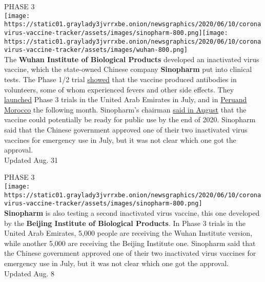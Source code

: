 PHASE 3\\
\texttt{[image: https://static01.graylady3jvrrxbe.onion/newsgraphics/2020/06/10/coronavirus-vaccine-tracker/assets/images/sinopharm-800.png]}\texttt{[image: https://static01.graylady3jvrrxbe.onion/newsgraphics/2020/06/10/coronavirus-vaccine-tracker/assets/images/wuhan-800.png]}\\
The \textbf{Wuhan Institute of Biological Products} developed an
inactivated virus vaccine, which the state-owned Chinese company
\textbf{Sinopharm} put into clinical tests. The Phase 1/2 trial
\href{https://jamanetwork.com/journals/jama/fullarticle/2769612}{showed}
that the vaccine produced antibodies in volunteers, some of whom
experienced fevers and other side effects. They
\href{https://www.thenational.ae/world/coronavirus-live-uk-accuses-russia-of-trying-to-steal-vaccine-research-1.1042256}{launched}
Phase 3 trials in the United Arab Emirates in July, and in
\href{https://www.reuters.com/article/us-health-coronavirus-vaccine-sinopharm/peru-morocco-to-test-china-sinopharms-covid-19-vaccine-in-phase-3-trial-idUSKCN25G0G9}{Peru}\href{https://www.reuters.com/article/us-health-coronavirus-vaccine-sinopharm/peru-morocco-to-test-china-sinopharms-covid-19-vaccine-in-phase-3-trial-idUSKCN25G0G9}{and
Morocco} the following month. Sinopharm's chairman
\href{https://www.nytimes3xbfgragh.onion/reuters/2020/08/18/world/europe/18reuters-health-coronavirus-vaccine-sinopharm.html}{said
in August} that the vaccine could potentially be ready for public use by
the end of 2020. Sinopharm said that the Chinese government approved one
of their two inactivated virus vaccines for emergency use in July, but
it was not clear which one got the approval.\\
Updated Aug. 31

PHASE 3\\
\texttt{[image: https://static01.graylady3jvrrxbe.onion/newsgraphics/2020/06/10/coronavirus-vaccine-tracker/assets/images/sinopharm-800.png]}\\
\textbf{Sinopharm} is also testing a second inactivated virus vaccine,
this one developed by the \textbf{Beijing Institute of Biological
Products}. In Phase 3 trials in the United Arab Emirates, 5,000 people
are receiving the Wuhan Institute version, while another 5,000 are
receiving the Beijing Institute one. Sinopharm said that the Chinese
government approved one of their two inactivated virus vaccines for
emergency use in July, but it was not clear which one got the
approval.\\
Updated Aug. 8

